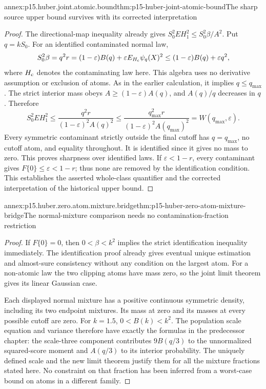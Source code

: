\begin{annexitem}{annex:p15.huber.joint.atomic.bound}{thm:p15-huber-joint-atomic-bound}{The sharp source upper bound survives with its corrected interpretation}
\begin{proof}
The directional-map inequality already gives
\(S_0^2EH_1^2\leq S_0^2\beta/A^2\).
Put \(q=kS_0\). For an identified contaminated normal law,
\[
 S_0^2\beta=q^2r
   =(1-\varepsilon)B(q)+\varepsilon E_{H_{\rm c}}\psi_q(X)^2
   \leq(1-\varepsilon)B(q)+\varepsilon q^2,
\]
where \(H_{\rm c}\) denotes the contaminating law here.
This algebra uses no derivative assumption or exclusion of atoms.
As in the earlier calculation, it implies \(q\leq q_{\max}\).
The strict interior mass obeys
\(A\geq(1-\varepsilon)A(q)\), and \(A(q)/q\) decreases in \(q\).
Therefore
\[
 S_0^2EH_1^2
 \leq\frac{q^2r}{(1-\varepsilon)^2A(q)^2}
 \leq\frac{q_{\max}^2r}{(1-\varepsilon)^2A(q_{\max})^2}
 =W(q_{\max},\varepsilon).
\]
Every symmetric contaminant strictly outside the final cutoff
has \(q=q_{\max}\), no cutoff atom, and equality throughout.
It is identified since it gives no mass to zero.
This proves sharpness over identified laws.
If \(\varepsilon<1-r\), every contaminant gives
\(F\{0\}\leq\varepsilon<1-r\); thus none are removed by the
identification condition. This establishes the asserted
whole-class quantifier and the corrected interpretation of the
historical upper bound.
\end{proof}
\end{annexitem}

\begin{annexitem}{annex:p15.huber.zero.atom.mixture.bridge}{thm:p15-huber-zero-atom-mixture-bridge}{The normal-mixture comparison needs no contamination-fraction restriction}
\begin{proof}
If \(F\{0\}=0\), then \(0<\beta<k^2\) implies the strict
identification inequality immediately. The identification proof
already gives eventual unique estimation and almost-sure
consistency without any condition on the largest atom.
For a non-atomic law the two clipping atoms have mass zero,
so the joint limit theorem gives its linear Gaussian case.

Each displayed normal mixture has a positive continuous
symmetric density, including its two endpoint mixtures.
Its mass at zero and its masses at every possible cutoff are zero.
For \(k=1.5\), \(0<B(k)<k^2\).
The population scale equation and variance therefore have
exactly the formulas in the predecessor chapter:
the scale-three component contributes \(9B(q/3)\) to the
unnormalized squared-score moment and \(A(q/3)\) to its interior
probability. The uniquely defined scale and the new limit theorem
justify them for all the mixture fractions stated here.
No constraint on that fraction has been inferred from a worst-case
bound on atoms in a different family.
\end{proof}
\end{annexitem}

